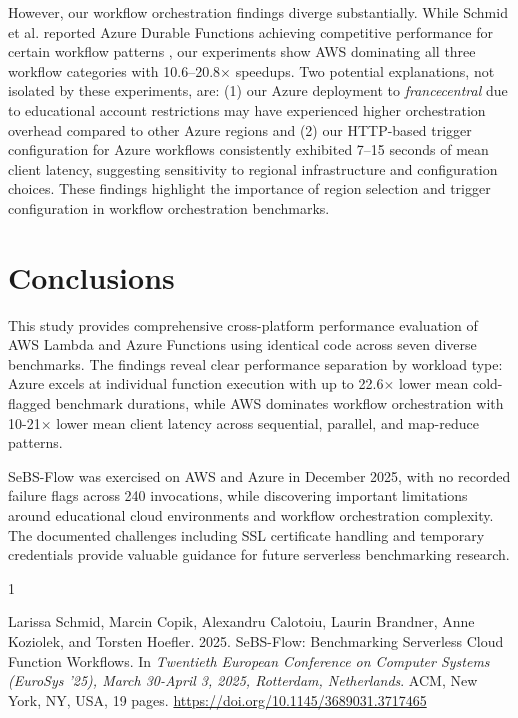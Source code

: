 \documentclass[sigconf,nonacm]{acmart}
\begin{document}
However, our workflow orchestration findings diverge substantially. While Schmid et al. reported Azure Durable Functions achieving competitive performance for certain workflow patterns \cite{sebsflow}, our experiments show AWS dominating all three workflow categories with 10.6--20.8$\times$ speedups. Two potential explanations, not isolated by these experiments, are: (1) our Azure deployment to \textit{francecentral} due to educational account restrictions may have experienced higher orchestration overhead compared to other Azure regions and (2) our HTTP-based trigger configuration for Azure workflows consistently exhibited 7--15 seconds of mean client latency, suggesting sensitivity to regional infrastructure and configuration choices. These findings highlight the importance of region selection and trigger configuration in workflow orchestration benchmarks.


\section{Conclusions}

This study provides comprehensive cross-platform performance evaluation of AWS Lambda and Azure Functions using identical code across seven diverse benchmarks. The findings reveal clear performance separation by workload type: Azure excels at individual function execution with up to 22.6$\times$ lower mean cold-flagged benchmark durations, while AWS dominates workflow orchestration with 10-21$\times$ lower mean client latency across sequential, parallel, and map-reduce patterns.

SeBS-Flow was exercised on AWS and Azure in December 2025, with no recorded failure flags across 240 invocations, while discovering important limitations around educational cloud environments and workflow orchestration complexity. The documented challenges including SSL certificate handling and temporary credentials provide valuable guidance for future serverless benchmarking research.

\begin{thebibliography}{1}

Larissa Schmid, Marcin Copik, Alexandru Calotoiu, Laurin Brandner, Anne Koziolek, and Torsten Hoefler. 2025.
SeBS-Flow: Benchmarking Serverless Cloud Function Workflows.
In \textit{Twentieth European Conference on Computer Systems (EuroSys ’25), March 30-April 3, 2025, Rotterdam, Netherlands}.
ACM, New York, NY, USA, 19 pages.
\url{https://doi.org/10.1145/3689031.3717465}

\end{thebibliography}
\end{document}
